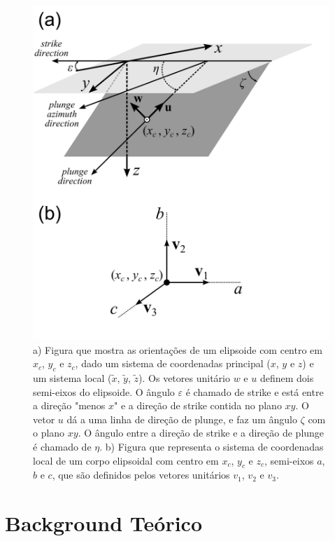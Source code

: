 \begin{figure}[hbt!]
	\centering \includegraphics[width=12 cm,height=14.5 cm]{figures/structural_orientation_angles}
	\caption[Figura que mostra as orientações de um elipsoide dado um sistema de coordenadas principal ($x$, $y$e $z$) e um sistema local ($\tilde{x}$, $\tilde{y}$, $\tilde{z}$.)]{a) Figura que mostra as orientações de um elipsoide com centro em $x_c$, $y_c$ e $z_c$, dado um sistema de coordenadas principal ($x$, $y$ e $z$) e um sistema local ($\tilde{x}$, $\tilde{y}$, $\tilde{z}$). Os vetores unitário $w$ e $u$ definem dois semi-eixos do elipsoide. O ângulo $\varepsilon$ é chamado de strike e está entre a direção "menos $x$" e a direção de strike contida no plano $xy$. O vetor $u$ dá a uma linha de direção de plunge, e faz um ângulo $\zeta$ com o plano $xy$. O ângulo entre a direção de strike e a direção de plunge é chamado de $\eta$. b) Figura que representa o sistema de coordenadas local de um corpo elipsoidal com centro em $x_c$, $y_c$ e $z_c$, semi-eixos $a$, $b$ e $c$, que são definidos pelos vetores unitários $v_1$, $v_2$ e $v_3$.}
	\label{fig:structural_orientation_angles}
\end{figure}

\section{Background Teórico}

